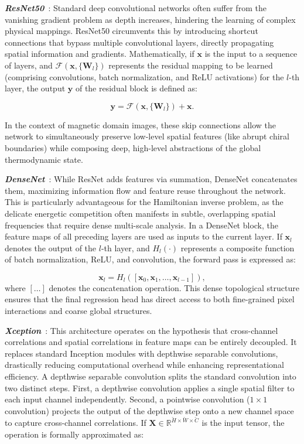 \documentclass[final,5p,times,twocolumn]{elsarticle}
\begin{document}
\emph{\textbf{ResNet50}}~\cite{koonce2021resnet}: Standard deep convolutional networks often suffer from the vanishing gradient problem as depth increases, hindering the learning of complex physical mappings. ResNet50 circumvents this by introducing shortcut connections that bypass multiple convolutional layers, directly propagating spatial information and gradients. Mathematically, if $\mathbf{x}$ is the input to a sequence of layers, and $\mathcal{F}(\mathbf{x}, \{\mathbf{W}_l\})$ represents the residual mapping to be learned (comprising convolutions, batch normalization, and ReLU activations) for the $l$-th layer, the output $\mathbf{y}$ of the residual block is defined as:

\begin{equation}\label{eq:ResNet}
\mathbf{y} = \mathcal{F}(\mathbf{x}, \{\mathbf{W}_l\}) + \mathbf{x}.
\end{equation}

In the context of magnetic domain images, these skip connections allow the network to simultaneously preserve low-level spatial features (like abrupt chiral boundaries) while composing deep, high-level abstractions of the global thermodynamic state.

\emph{\textbf{DenseNet}}~\cite{huang2017densely}: While ResNet adds features via summation, DenseNet concatenates them, maximizing information flow and feature reuse throughout the network. This is particularly advantageous for the Hamiltonian inverse problem, as the delicate energetic competition often manifests in subtle, overlapping spatial frequencies that require dense multi-scale analysis. In a DenseNet block, the feature maps of all preceding layers are used as inputs to the current layer. If $\mathbf{x}_l$ denotes the output of the $l$-th layer, and $H_l(\cdot)$ represents a composite function of batch normalization, ReLU, and convolution, the forward pass is expressed as:

\begin{equation}\label{eq:DenseNet}
\mathbf{x}_l = H_l([\mathbf{x}_0, \mathbf{x}_1, \dots, \mathbf{x}_{l-1}]),
\end{equation}
where $[\dots]$ denotes the concatenation operation. This dense topological structure ensures that the final regression head has direct access to both fine-grained pixel interactions and coarse global structures.

\emph{\textbf{Xception}}~\cite{chollet2017xception}: This architecture operates on the hypothesis that cross-channel correlations and spatial correlations in feature maps can be entirely decoupled. It replaces standard Inception modules with depthwise separable convolutions, drastically reducing computational overhead while enhancing representational efficiency. A depthwise separable convolution splits the standard convolution into two distinct steps. First, a depthwise convolution applies a single spatial filter to each input channel independently. Second, a pointwise convolution ($1 \times 1$ convolution) projects the output of the depthwise step onto a new channel space to capture cross-channel correlations. If $\mathbf{X} \in \mathbb{R}^{\breve{H} \times \breve{W} \times \breve{C}}$ is the input tensor, the operation is formally approximated as:
\end{document}
